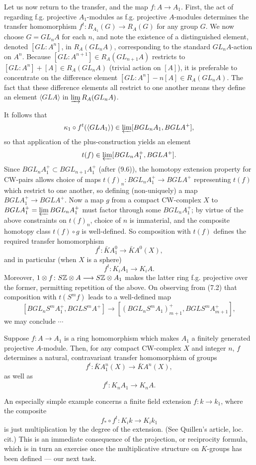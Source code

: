 Let us now return to the transfer, and the map $f\colon   A \longrightarrow A_1$. First, the act of regarding f.g. projective $A_1$-modules as f.g. projective $A$-modules determines the transfer homomorphism $f^t \colon   R_{A_1} (G) \longrightarrow R_A(G)$ for any group $G$. We now choose $G = GL_nA$ for each $n$, and note the existence of a distinguished element, denoted $[GL:A^n]$, in $R_A(GL_nA)$, corresponding to the standard $GL_nA$-action on $A^n$. Because $[GL:A^{n+1} ]\in R_A(GL_{n+1} A)$ restricts to $[GL:A^n] + [A] \in R_A(GL_nA)$ (trivial action on $[A]$), it is preferable to concentrate on the difference element $[GL:A^n ] - n[A] \in R_A(GL_nA)$. The fact that these difference elements all restrict to one another means they define an element $\langle GLA\rangle$ in $\varinjlim R_A(GL_nA)$.

It follows that
\[\kappa_1\circ f^t(\langle GLA_1\rangle) \in \varprojlim [BGL_nA_1,BGLA^+], \]
so that application of the plus-construction yields an element 
\[t(f)\in\varprojlim[BGL_nA_1^+,BGLA^+] .\]
Since $BGL_nA_1^+ \subset BGL_{n+1} A_1^+$ (after (9.6)), the homotopy extension property for CW-pairs allows choice of maps $t(f)_n \colon  BGL_nA_1^+ \longrightarrow BGLA^+$ representing $t(f)$ which restrict to one another, so defining (non-uniquely) a map $BGLA_1^+ \longrightarrow BGLA^+$. Now a map $g$ from a compact CW-complex $X$ to $BGLA_1^+ = \varprojlim BGL_nA_1^+$ must factor through some $BGL_nA_1^+$; by virtue of the above constraints on $t(f)_n$, choice of $n$ is immaterial, and the composite homotopy class $t(f) \circ g$ is well-defined. So composition with $t(f)$ defines the required transfer homomorphism
\[f^t\colon \bar{K}A_1^0 \longrightarrow \bar{K}A^0(X),\]
and in particular (when $X$ is a sphere)
\[f^t\colon K_iA_1 \longrightarrow K_iA .\]
Moreover, $1 \otimes f\colon S\mathbb{Z}\otimes A\longrightarrow S\mathbb{Z}\otimes A_1$ makes the latter ring f.g. projective over the former, permitting repetition of the above. On observing from (7.2) that composition with $t(S^mf)$ leads to a well-defined map
\[[BGL_nS^mA_1^+,BGLS^mA^+]\longrightarrow [(BGL_nS^mA_1)_{m+1}^+,BGLS^mA_{m+1}^+], \]
we may conclude $\cdots $
\begin{theorem}
Suppose $f\colon  A \longrightarrow A_1$ is a ring homomorphism which makes $A_1$ a finitely generated projective $A$-module. Then, for any compact CW-complex $X$ and integer $n$, $f$ determines a natural, contravariant transfer homomorphism of groups
\[f^t\colon \bar{K}A_1^n(X)\longrightarrow \bar{K}A^n(X),\]
as well as
\[f^t\colon K_nA_1\longrightarrow K_nA.\]
\end{theorem}

An especially simple example concerns a finite field extension $f\colon  k\longrightarrow k_1$, where the composite 
\[f_*\circ f^t \colon K_ik \longrightarrow K_ik_1\]
is just multiplication by the degree of the extension. (See Quillen's article, loc. cit.) This is an immediate consequence of the projection, or reciprocity formula, which is in turn an exercise once the multiplicative structure on $K$-groups has been defined --- our next task.
